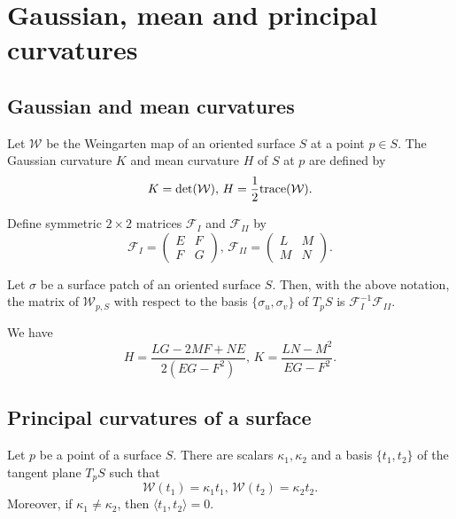 \section{Gaussian, mean and principal curvatures}

\subsection{Gaussian and mean curvatures}

\begin{defn}
  Let $\mathcal{W}$ be the Weingarten map of an oriented surface $S$
  at a point $p \in S$. The Gaussian curvature $K$ and mean curvature
  $H$ of $S$ at $p$ are defined by
  \[
    K = \det(\mathcal{W}), \, H = \frac{1}{2}\text{trace}(\mathcal{W}).
  \]
\end{defn}

Define symmetric $2 \times 2$ matrices $\mathcal{F}_I$ and $\mathcal{F}_{II}$ by
\[
  \mathcal{F}_I = \begin{pmatrix}
    E & F \\
    F & G
  \end{pmatrix}, \,
  \mathcal{F}_{II} = \begin{pmatrix}
    L & M \\
    M & N
  \end{pmatrix}.
\]

\begin{proposition}
  Let $\sigma$ be a surface patch of an oriented surface $S$.
  Then, with the above notation, the matrix of $\mathcal{W}_{p, S}$
  with respect to the basis $\{\sigma_u, \sigma_v\}$ of $T_p S$ is
  $\mathcal{F}_I^{-1} \mathcal{F}_{II}$.
\end{proposition}

\begin{corollary}
  We have
  \[
    H = \frac{LG - 2MF + NE}{2(EG - F^2)}, \,
    K = \frac{LN - M^2}{EG - F^2}.
  \]
\end{corollary}

\subsection{Principal curvatures of a surface}

\begin{proposition}
  Let $p$ be a point of a surface $S$.
  There are scalars $\kappa_1, \kappa_2$ and a basis $\{t_1, t_2\}$
  of the tangent plane $T_p S$ such that
  \[
    \mathcal{W}(t_1) = \kappa_1 t_1, \,
    \mathcal{W}(t_2) = \kappa_2 t_2.
  \]
  Moreover, if $\kappa_1 \neq \kappa_2$, then $\langle t_1, t_2 \rangle = 0$.
\end{proposition}

